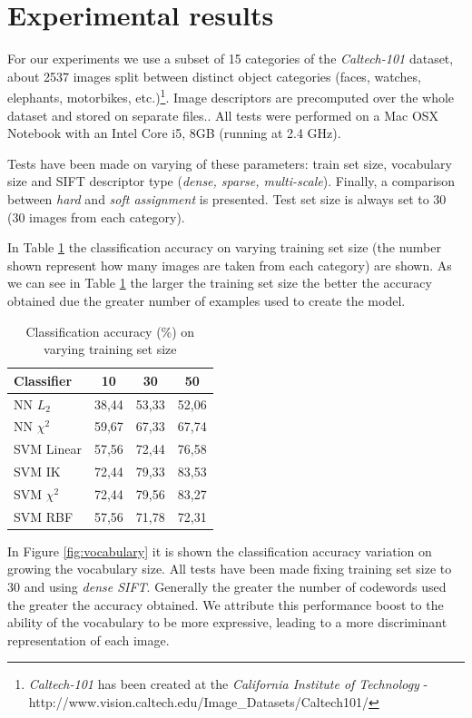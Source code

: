 \section{Experimental results}

For our experiments we use a subset of 15 categories of the \emph{Caltech-101} dataset, about 2537 images split between distinct object categories (faces, watches, elephants, motorbikes, etc.)\footnote{\emph{Caltech-101} has been created at the \emph{California Institute of Technology} - http://www.vision.caltech.edu/Image\_Datasets/Caltech101/}. Image descriptors are precomputed over the whole dataset and stored on separate files.. All tests were performed on a Mac OSX Notebook with an Intel Core i5, 8GB (running at 2.4 GHz).

Tests have been made on varying of these parameters: train set size, vocabulary size and SIFT descriptor type (\emph{dense, sparse, multi-scale}). Finally, a comparison between \emph{hard} and \emph{soft assignment} is presented. Test set size is always set to 30 (30 images from each category).

In Table \ref{tab:trainsetsize} the classification accuracy on varying training set size (the number shown represent how many images are taken from each category) are shown. As we can see in Table \ref{tab:trainsetsize} the larger the training set size the better the accuracy obtained due the greater number of examples used to create the model.

\begin{table}[h]
\begin{center}
\begin{tabular}{|l|c|c|c|}
\hline
Classifier & 10 & 30 & 50\\
\hline\hline
NN $L_2$ & 38,44 & 53,33 & 52,06\\
NN $\chi^2$ & 59,67 & 67,33 & 67,74\\
SVM Linear & 57,56 & 72,44 & 76,58\\
SVM IK & 72,44 & 79,33 & 83,53\\
SVM $\chi^2$ & 72,44 & 79,56 & 83,27\\
SVM RBF & 57,56 & 71,78 & 72,31 \\
\hline
\end{tabular}
\end{center}
\label{tab:trainsetsize}
\caption{Classification accuracy (\%) on varying training set size}
\end{table}

In Figure \ref{fig:vocabulary} it is shown the classification accuracy variation on growing the vocabulary size. All tests have been made fixing training set size to 30 and using \emph{dense SIFT}. Generally the greater the number of codewords used the greater the accuracy obtained. We attribute this performance boost to the ability of the vocabulary to be more expressive, leading to a more discriminant representation of each image.

